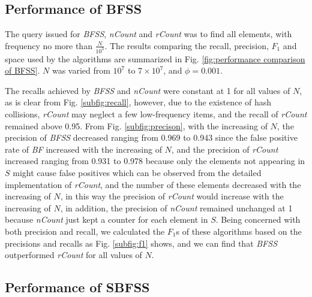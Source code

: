 \documentclass[conference]{IEEEtran}
\begin{document}
\subsection{Performance of BFSS}
The query issued for \emph{BFSS}, \emph{nCount} and \emph{rCount} was to find all elements, with frequency no more than $\frac{N}{10^3}$. The results comparing the recall, precision, $F_1$ and space used by the algorithms are summarized in Fig. \ref{fig:performance comparison of BFSS}. $N$ was varied from $10^7$ to $7\times 10^7$, and $\phi=0.001$.\par
The recalls achieved by \emph{BFSS} and \emph{nCount} were constant at 1 for all values of $N$, as is clear from Fig. \ref{subfig:recall}, however, due to the existence of hash collisions, \emph{rCount} may neglect a few low-frequency items, and the recall of \emph{rCount} remained above 0.95. From Fig. \ref{subfig:precison}, with the increasing of $N$, the precision of \emph{BFSS} decreased ranging from 0.969 to 0.943 since the false positive rate of \emph{BF} increased with the increasing of $N$, and the precision of \emph{rCount} increased ranging from 0.931 to 0.978 because only the elements not appearing in $S$ might cause false positives which can be observed from the detailed implementation of \emph{rCount}, and the number of these elements decreased with the increasing of $N$, in this way the precision of \emph{rCount} would increase with the increasing of $N$, in addition, the precision of \emph{nCount} remained unchanged at 1 because \emph{nCount} just kept a counter for each element in $S$. Being concerned with both precision and recall, we calculated the $F_1$s of these algorithms based on the precisions and recalls as Fig. \ref{subfig:f1} shows, and we can find that \emph{BFSS} outperformed \emph{rCount} for all values of $N$.
\subsection{Performance of SBFSS}

%
%
\end{document}

